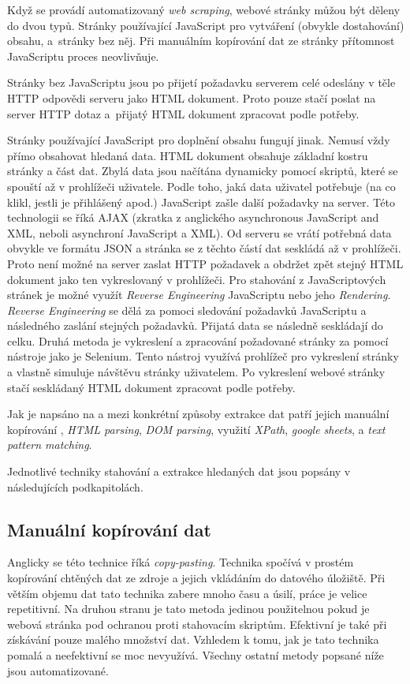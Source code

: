 Když se provádí automatizovaný \emph{web scraping}, webové stránky můžou být děleny do dvou typů. Stránky používající JavaScript pro vytváření (obvykle dostahování) obsahu, a~stránky bez něj. Při manuálním kopírování dat ze stránky přítomnost JavaScriptu proces neovlivňuje.

Stránky bez JavaScriptu jsou po přijetí požadavku serverem celé odeslány v těle HTTP odpovědi serveru jako HTML dokument. Proto pouze stačí poslat na server HTTP dotaz a~přijatý HTML dokument zpracovat podle potřeby. 

Stránky používající JavaScript pro doplnění obsahu fungují jinak. Nemusí vždy přímo obsahovat hledaná data. HTML dokument obsahuje základní kostru stránky a část dat. Zbylá data jsou načítána dynamicky pomocí skriptů, které se spouští až v prohlížeči uživatele.
Podle toho, jaká data uživatel potřebuje (na co klikl, jestli je přihlášený apod.) JavaScript zašle další požadavky na server. Této technologii se říká AJAX (zkratka z anglického asynchronous JavaScript and XML, neboli asynchroní JavaScript a XML).
Od serveru se vrátí potřebná data obvykle ve formátu JSON a stránka se z těchto částí dat seskládá až v prohlížeči. Proto není možné na server zaslat HTTP požadavek a obdržet zpět stejný HTML dokument jako ten vykreslovaný v prohlížeči.
Pro stahování z JavaScriptových stránek je možné využít \emph{Reverse Engineering} JavaScriptu nebo jeho \emph{Rendering}. \emph{Reverse Engineering} se dělá za pomoci sledování požadavků JavaScriptu a následného zaslání stejných požadavků. Přijatá data se následně seskládají do celku. Druhá metoda je vykreslení a zpracování požadované stránky za pomocí nástroje jako je Selenium. Tento nástroj využívá prohlížeč pro vykreslení stránky a vlastně simuluje návštěvu stránky uživatelem. Po vykreslení webové stránky stačí seskládaný HTML dokument zpracovat podle potřeby.

Jak je napsáno na \cite{shieldsquare} a \cite{jetruby} mezi konkrétní způsoby extrakce dat patří jejich manuální kopírování , \emph{HTML parsing}, \emph{DOM parsing}, využití \emph{XPath}, \emph{google sheets}, a \emph{text pattern matching}. 

Jednotlivé techniky stahování a extrakce hledaných dat jsou popsány v následujících podkapitolách.

\subsection{Manuální kopírování dat}
Anglicky se této technice říká \emph{copy-pasting}. Technika spočívá v prostém kopírování chtěných dat ze zdroje a jejich vkládáním do datového úložiště. Při větším objemu dat tato technika zabere mnoho času a úsilí, práce je velice repetitivní. Na druhou stranu je tato metoda jedinou použitelnou pokud je webová stránka pod ochranou proti stahovacím skriptům. Efektivní je také při získávání pouze malého množství dat. Vzhledem k tomu, jak je tato technika pomalá a neefektivní se moc nevyužívá. Všechny ostatní metody popsané níže jsou automatizované.

